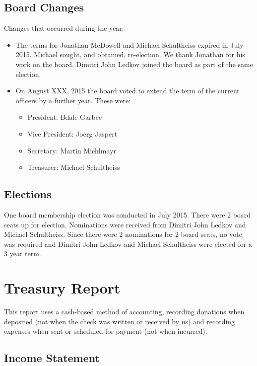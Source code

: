 \documentclass[letterpaper]{report}
\begin{document}
\section{Board Changes}

Changes that occurred during the year:

\begin{itemize} \item The terms for Jonathan McDowell and Michael
Schultheiss expired in July 2015.  Michael sought, and obtained,
re-election.  We thank Jonathan for his work on the board.  Dimitri John
Ledkov joined the board as part of the same election.

\item On August XXX, 2015 the board voted to extend the term of the
current officers by a further year. These were:
\begin{itemize}
\item President: Bdale Garbee
\item Vice President: Joerg Jaspert
\item Secretary: Martin Michlmayr
\item Treasurer: Michael Schultheiss
\end{itemize}
\end{itemize}

\section{Elections}

One board membership election was conducted in July 2015.  There were 2
board seats up for election.  Nominations were received from Dimitri
John Ledkov and Michael Schultheiss.  Since there were 2 nominations for
2 board seats, no vote was required and Dimitri John Ledkov and Michael
Schultheiss were elected for a 3 year term.

\chapter{Treasury Report}

This report uses a cash-based method of accounting, recording donations when
deposited (not when the check was written or received by us) and recording
expenses when sent or scheduled for payment (not when incurred).

\section{Income Statement}
\end{document}
